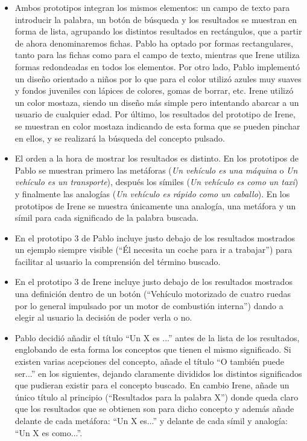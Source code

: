 \begin{itemize}
	\item Ambos prototipos integran los mismos elementos: un campo de texto para introducir la palabra, un botón de búsqueda y los resultados se muestran en forma de lista, agrupando los distintos resultados en rectángulos, que a partir de ahora denominaremos fichas.
	Pablo ha optado por formas rectangulares, tanto para las fichas como para el campo de texto, mientras que Irene utiliza formas redondeadas en todos los elementos. 
	Por otro lado, Pablo implementó un diseño orientado a niños por lo que para el color utilizó azules muy suaves y fondos juveniles con lápices de colores, gomas de borrar, etc.  Irene utilizó un color mostaza, siendo un diseño más simple pero intentando abarcar a un usuario de cualquier edad. Por último, los resultados del prototipo de Irene, se muestran en color mostaza indicando de esta forma que se pueden pinchar en ellos, y se realizará la búsqueda del concepto pulsado.
	
	\item El orden a la hora de mostrar los resultados es distinto. En los prototipos de Pablo se muestran primero las metáforas (\textit{Un vehículo es una máquina} o \textit{Un vehículo es un transporte}), después los símiles (\textit{Un vehículo es como un taxi}) y finalmente las analogías (\textit{Un vehículo es rápido como un caballo}). En los prototipos de Irene se muestra únicamente una analogía, una metáfora y un símil para cada significado de la palabra buscada.
	
	\item En el prototipo 3 de Pablo incluye justo debajo de los resultados mostrados un ejemplo siempre visible (``Él necesita un coche para ir a trabajar'') para facilitar al usuario la comprensión del término buscado.
	
	 \item En el prototipo 3 de Irene incluye justo debajo de los resultados mostrados una definición dentro de un botón (``Vehículo motorizado de cuatro ruedas por lo general impulsado por un motor de combustión interna'') dando a elegir al usuario la decisión de poder verla o no.
	
	\item Pablo decidió añadir el título ``Un X es ...'' antes de la lista de los resultados, englobando de esta forma los conceptos que tienen el mismo significado. Si existen varias acepciones del concepto, añade el título ``O también puede ser...'' en los siguientes, dejando claramente divididos los distintos significados que pudieran existir para el concepto buscado. En cambio Irene, añade un único título al principio (``Resultados para la palabra X'') donde queda claro que los resultados que se obtienen son para dicho concepto y además añade delante de cada metáfora: ``Un X es...''  y delante de cada símil y analogía: ``Un X es como...''.


\end{itemize}
